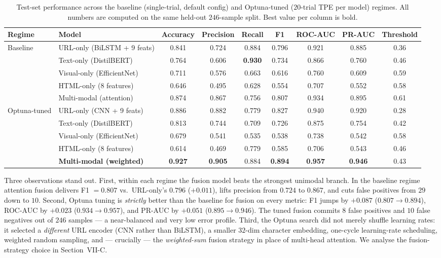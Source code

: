 \documentclass[conference]{IEEEtran}
\begin{document}
\begin{table}[t]
\caption{Test-set performance across the baseline (single-trial,
default config) and Optuna-tuned ($20$-trial TPE per model) regimes.
All numbers are computed on the same held-out $246$-sample split.
Best value per column is bold.}
\label{tab:main}
\centering
\small
\begin{tabular}{llccccccc}
\toprule
Regime & Model & Accuracy & Precision & Recall & F1 & ROC-AUC & PR-AUC & Threshold \\
\midrule
\multirow{5}{*}{Baseline}
 & URL-only (BiLSTM + 9 feats) & 0.841 & 0.724 & 0.884 & 0.796 & 0.921 & 0.885 & 0.36 \\
 & Text-only (DistilBERT)      & 0.764 & 0.606 & \textbf{0.930} & 0.734 & 0.866 & 0.760 & 0.46 \\
 & Visual-only (EfficientNet)  & 0.711 & 0.576 & 0.663 & 0.616 & 0.760 & 0.609 & 0.59 \\
 & HTML-only (8 features)      & 0.646 & 0.495 & 0.628 & 0.554 & 0.707 & 0.552 & 0.58 \\
 & Multi-modal (attention)     & 0.874 & 0.867 & 0.756 & 0.807 & 0.934 & 0.895 & 0.61 \\
\midrule
\multirow{5}{*}{Optuna-tuned}
 & URL-only (CNN + 9 feats)    & 0.886 & 0.882 & 0.779 & 0.827 & 0.940 & 0.920 & 0.28 \\
 & Text-only (DistilBERT)      & 0.813 & 0.744 & 0.709 & 0.726 & 0.875 & 0.754 & 0.42 \\
 & Visual-only (EfficientNet)  & 0.679 & 0.541 & 0.535 & 0.538 & 0.738 & 0.542 & 0.58 \\
 & HTML-only (8 features)      & 0.614 & 0.469 & 0.779 & 0.585 & 0.706 & 0.543 & 0.46 \\
 & \textbf{Multi-modal (weighted)} & \textbf{0.927} & \textbf{0.905} & 0.884 & \textbf{0.894} & \textbf{0.957} & \textbf{0.946} & 0.43 \\
\bottomrule
\end{tabular}
\end{table}

Three observations stand out.  First, within each regime the fusion
model beats the strongest unimodal branch.  In the baseline regime
attention fusion delivers F1 $=0.807$ vs.\ URL-only's $0.796$
($+0.011$), lifts precision from $0.724$ to $0.867$, and cuts false
positives from $29$ down to $10$.  Second, Optuna tuning is
\emph{strictly} better than the baseline for fusion on every metric:
F1 jumps by $+0.087$ ($0.807\!\to\!0.894$), ROC-AUC by $+0.023$
($0.934\!\to\!0.957$), and PR-AUC by $+0.051$
($0.895\!\to\!0.946$).  The tuned fusion commits $8$ false positives
and $10$ false negatives out of $246$ samples --- a near-balanced and
very low error profile.  Third, the Optuna search did not merely
shuffle learning rates: it selected a \emph{different} URL encoder
(CNN rather than BiLSTM), a smaller $32$-dim character embedding,
one-cycle learning-rate scheduling, weighted random sampling, and
--- crucially --- the \emph{weighted-sum} fusion strategy in place of
multi-head attention.  We analyse the fusion-strategy choice in
Section~VII-C.
\end{document}
